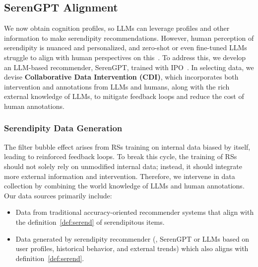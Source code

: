 \subsection{SerenGPT Alignment}\label{sec:align}
We now obtain cognition profiles, so LLMs can leverage profiles and other information to make serendipity recommendations. However, human perception of serendipity is nuanced and personalized, and zero-shot or even fine-tuned LLMs struggle to align with human perspectives on this~\cite{fu2024art,tokutake2024can}. To address this, we develop an LLM-based recommender, SerenGPT, trained with IPO~\cite{azar2024general}. In selecting data, we devise \textbf{Collaborative Data Intervention (CDI)}, which incorporates both intervention and annotations from LLMs and humans, along with the rich external knowledge of LLMs, to mitigate feedback loops and reduce the cost of human annotations.

\subsubsection{Serendipity Data Generation}\label{sec:data_gen}






The filter bubble effect arises from RSs training on internal data biased by itself, leading to reinforced feedback loops. To break this cycle, the training of RSs should not solely rely on unmodified internal data; instead, it should integrate more external information and intervention. Therefore, we intervene in data collection by combining the world knowledge of LLMs and human annotations.
Our data sources primarily include:
\begin{itemize}
    \item Data from traditional accuracy-oriented recommender systems that align with the definition~\ref{def:serend} of serendipitous items.
    \item Data generated by serendipity recommender (\eg, SerenGPT or LLMs based on user profiles, historical behavior, and external trends) which also aligns with definition~\ref{def:serend}.
\end{itemize}



